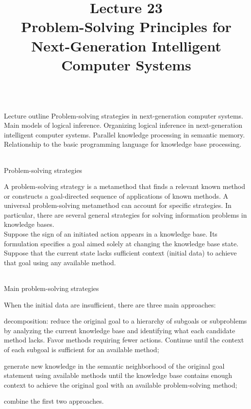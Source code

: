 \title{Lecture 23\\Problem-Solving Principles for Next-Generation Intelligent Computer Systems}

\begin{frame}
	\titlepage
\end{frame}

\begin{frame}{\\Lecture outline}
	\topline
	\justifying
	Problem-solving strategies in next-generation computer systems. Main models of logical inference. Organizing logical inference in next-generation intelligent computer systems. Parallel knowledge processing in semantic memory. Relationship to the basic programming language for knowledge base processing.
\end{frame}

\begin{frame}{\\Problem-solving strategies}
\topline
\justifying
\vspace{10mm}

    A problem-solving strategy is a metamethod that finds a relevant known method or constructs a goal-directed sequence of applications of known methods. A universal problem-solving metamethod can account for specific strategies. In particular, there are several general strategies for solving information problems in knowledge bases.\\
    Suppose the sign of an initiated action appears in a knowledge base. Its formulation specifies a goal aimed solely at changing the knowledge base state. Suppose that the current state lacks sufficient context (initial data) to achieve that goal using any available method.
\end{frame}

\begin{frame}{\\Main problem-solving strategies}
\topline
\justifying
\vspace{10mm}

    When the initial data are insufficient, there are three main approaches:
    \begin{textitemize}
        \item decomposition: reduce the original goal to a hierarchy of subgoals or subproblems by analyzing the current knowledge base and identifying what each candidate method lacks. Favor methods requiring fewer actions. Continue until the context of each subgoal is sufficient for an available method;
        \item generate new knowledge in the semantic neighborhood of the original goal statement using available methods until the knowledge base contains enough context to achieve the original goal with an available problem-solving method;
        \item combine the first two approaches.
    \end{textitemize}
\end{frame}

